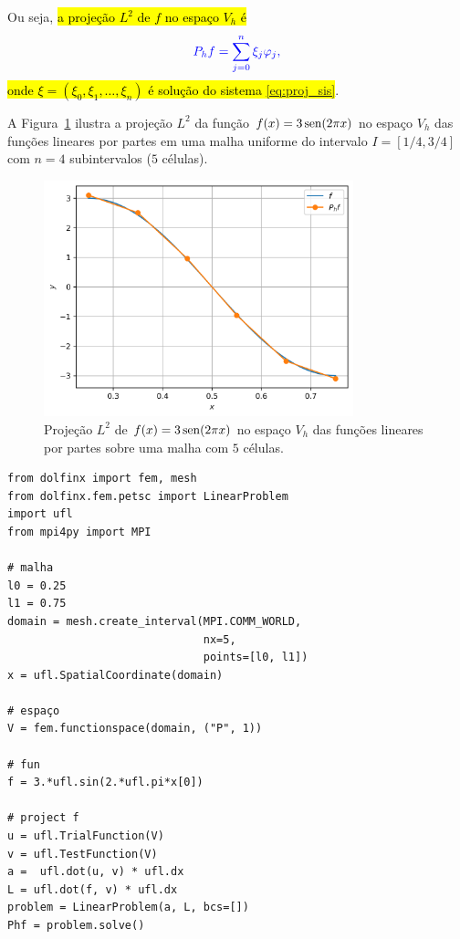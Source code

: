 Ou seja, \hl{a projeção $L^2$ de $f$ no espaço $V_h$ é}
\begin{equation}\color{blue}P_hf = \sum_{j=0}^n\xi_j\varphi_j,
\end{equation}
\hl{onde $\xi = (\xi_0, \xi_1, \dotsc, \xi_n)$ é solução do sistema {\eqref{eq:proj_sis}}}.

\begin{ex}\label{ex:mef1d_proj}
  A Figura~\ref{fig:ex_mef1d_proj} ilustra a projeção $L^2$ da função $f(x)=3\operatorname{sen}(2\pi x)$ no espaço $V_h$ das funções lineares por partes em uma malha uniforme do intervalo $I=[1/4, 3/4]$ com $n=4$ subintervalos ($5$ células).

  \begin{figure}[h!]
    \centering
    \includegraphics[width=0.8\textwidth]{./cap_mef1d/dados/ex_mef1d_proj/fig}
    \caption{Projeção $L^2$ de $f(x)=3\operatorname{sen}(2\pi x)$ no espaço $V_h$ das funções lineares por partes sobre uma malha com $5$ células.}
    \label{fig:ex_mef1d_proj}
  \end{figure}

\begin{lstlisting}[caption=ex\_mef1d\_proj.py]
from dolfinx import fem, mesh
from dolfinx.fem.petsc import LinearProblem
import ufl
from mpi4py import MPI

# malha
l0 = 0.25
l1 = 0.75
domain = mesh.create_interval(MPI.COMM_WORLD,
                              nx=5,
                              points=[l0, l1])
x = ufl.SpatialCoordinate(domain)

# espaço
V = fem.functionspace(domain, ("P", 1))

# fun
f = 3.*ufl.sin(2.*ufl.pi*x[0])

# project f
u = ufl.TrialFunction(V)
v = ufl.TestFunction(V)
a =  ufl.dot(u, v) * ufl.dx
L = ufl.dot(f, v) * ufl.dx
problem = LinearProblem(a, L, bcs=[])
Phf = problem.solve()
\end{lstlisting}
\end{ex}

